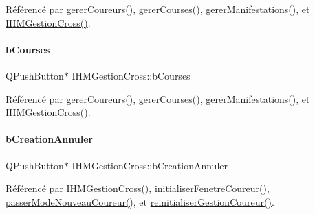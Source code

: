 Référencé par \hyperlink{class_i_h_m_gestion_cross_ad46a2295500cf98dbc18f862f6020103}{gerer\+Coureurs()}, \hyperlink{class_i_h_m_gestion_cross_a82e3861f4959d3599d1d85ee0b3b8654}{gerer\+Courses()}, \hyperlink{class_i_h_m_gestion_cross_a406efb83dac8a8ac5d04e9b8cbeaf316}{gerer\+Manifestations()}, et \hyperlink{class_i_h_m_gestion_cross_a2c62fd83326a87456a403f46acc408c8}{I\+H\+M\+Gestion\+Cross()}.

\mbox{\label{class_i_h_m_gestion_cross_a0df377aec07ada51a115cc458854c966}} 
\paragraph{\texorpdfstring{b\+Courses}{bCourses}}
{\footnotesize\ttfamily Q\+Push\+Button$\ast$ I\+H\+M\+Gestion\+Cross\+::b\+Courses\hspace{0.3cm}{\ttfamily [private]}}



Référencé par \hyperlink{class_i_h_m_gestion_cross_ad46a2295500cf98dbc18f862f6020103}{gerer\+Coureurs()}, \hyperlink{class_i_h_m_gestion_cross_a82e3861f4959d3599d1d85ee0b3b8654}{gerer\+Courses()}, \hyperlink{class_i_h_m_gestion_cross_a406efb83dac8a8ac5d04e9b8cbeaf316}{gerer\+Manifestations()}, et \hyperlink{class_i_h_m_gestion_cross_a2c62fd83326a87456a403f46acc408c8}{I\+H\+M\+Gestion\+Cross()}.

\mbox{\label{class_i_h_m_gestion_cross_a297a77054dc0f54e461c0f9b0382efb3}} 
\paragraph{\texorpdfstring{b\+Creation\+Annuler}{bCreationAnnuler}}
{\footnotesize\ttfamily Q\+Push\+Button$\ast$ I\+H\+M\+Gestion\+Cross\+::b\+Creation\+Annuler\hspace{0.3cm}{\ttfamily [private]}}



Référencé par \hyperlink{class_i_h_m_gestion_cross_a2c62fd83326a87456a403f46acc408c8}{I\+H\+M\+Gestion\+Cross()}, \hyperlink{class_i_h_m_gestion_cross_aa5d9de499a66e52b843c4ef4c6074a60}{initialiser\+Fenetre\+Coureur()}, \hyperlink{class_i_h_m_gestion_cross_ac8f336c95a5f0c9eb8a4bc1c4bb83445}{passer\+Mode\+Nouveau\+Coureur()}, et \hyperlink{class_i_h_m_gestion_cross_a85c44933ec0dcbb591e01c832063367e}{reinitialiser\+Gestion\+Coureur()}.

